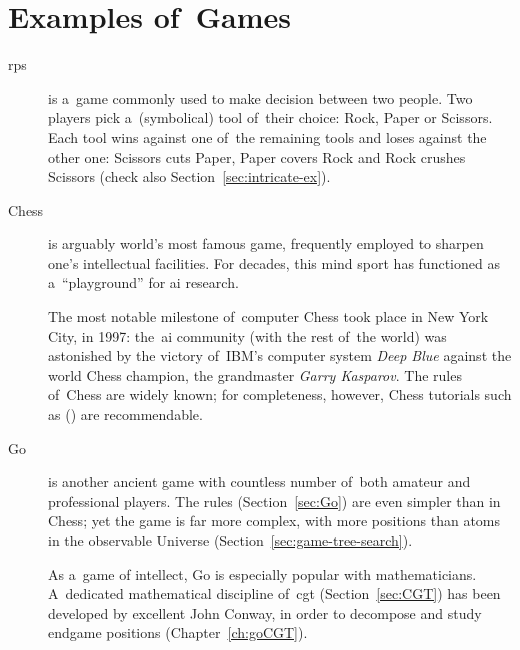 \section{Examples of~Games}
\label{sec:examples-of-games}
\newcommand{\figurewidthratio}{0.3}
\begin{description}
  \item [\acrfull{rps}] is a~game commonly used to make decision between two people.
    Two players pick a~(symbolical) tool of~their choice: Rock, Paper or Scissors.
    Each tool wins against one of~the remaining tools and loses against the other one: Scissors cuts Paper, Paper covers Rock and Rock crushes Scissors (check also Section~\ref{sec:intricate-ex}).

  \item [Chess] is arguably world's most famous game, frequently employed to sharpen one's intellectual facilities.
    For decades, this mind sport has functioned as a~``playground'' for \acrfull{ai} research.

    The most notable milestone of~computer Chess took place in New York City, in 1997:
    the~\acrshort{ai} community (with the rest of~the world) was astonished by the victory of~IBM's computer system \emph{Deep Blue} against the world Chess champion, the grandmaster \emph{Garry Kasparov}.
    The rules of~Chess are widely known; for completeness, however, Chess tutorials such as (\cite{Karpov1997disney}) are recommendable.

  \item [Go] is another ancient game with countless number of~both amateur and professional players.
    The rules (Section~\ref{sec:Go}) are even simpler than in Chess; yet the game is far more complex, with more positions than atoms in the observable Universe (Section~\ref{sec:game-tree-search}).

    As a~game of intellect, Go is especially popular with mathematicians.
    A~dedicated mathematical discipline of~\acrlong{cgt} (Section~\ref{sec:CGT}) has been developed by excellent John Conway, in order to decompose and study endgame positions (Chapter~\ref{ch:goCGT}).


\end{description}
